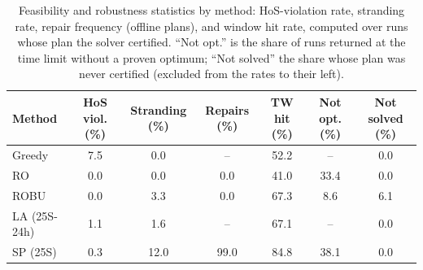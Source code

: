 \begin{table}[htbp]
\centering
\caption{Feasibility and robustness statistics by method: HoS-violation rate, stranding rate, repair frequency (offline plans), and window hit rate, computed over runs whose plan the solver certified.  ``Not opt.'' is the share of runs returned at the time limit without a proven optimum; ``Not solved'' the share whose plan was never certified (excluded from the rates to their left).}
\label{tab:feasibility}
\begin{tabular}{lcccccc}
\toprule
\textbf{Method} & \textbf{HoS viol. (\%)} & \textbf{Stranding (\%)} & \textbf{Repairs (\%)} & \textbf{TW hit (\%)} & \textbf{Not opt. (\%)} & \textbf{Not solved (\%)}\\
\midrule
Greedy & 7.5 & 0.0 & -- & 52.2 & -- & 0.0 \\
RO & 0.0 & 0.0 & 0.0 & 41.0 & 33.4 & 0.0 \\
ROBU & 0.0 & 3.3 & 0.0 & 67.3 & 8.6 & 6.1 \\
LA (25S-24h) & 1.1 & 1.6 & -- & 67.1 & -- & 0.0 \\
SP (25S) & 0.3 & 12.0 & 99.0 & 84.8 & 38.1 & 0.0 \\
\bottomrule
\end{tabular}
\end{table}
